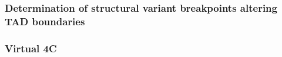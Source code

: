

\subsubsection{Determination of structural variant breakpoints altering TAD boundaries}


\subsubsection{Virtual 4C}

